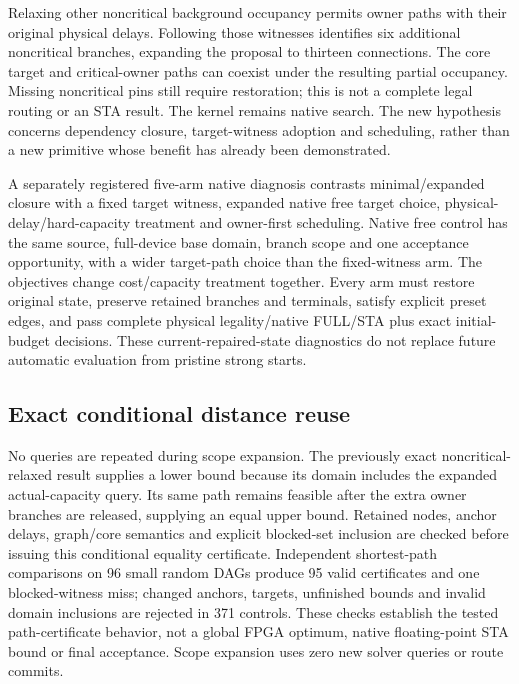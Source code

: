 Relaxing other noncritical background occupancy permits owner paths with their original physical delays. Following those witnesses identifies six additional noncritical branches, expanding the proposal to thirteen connections. The core target and critical-owner paths can coexist under the resulting partial occupancy. Missing noncritical pins still require restoration; this is not a complete legal routing or an STA result. The kernel remains native search. The new hypothesis concerns dependency closure, target-witness adoption and scheduling, rather than a new primitive whose benefit has already been demonstrated.

A separately registered five-arm native diagnosis contrasts minimal/expanded closure with a fixed target witness, expanded native free target choice, physical-delay/hard-capacity treatment and owner-first scheduling. Native free control has the same source, full-device base domain, branch scope and one acceptance opportunity, with a wider target-path choice than the fixed-witness arm. The objectives change cost/capacity treatment together. Every arm must restore original state, preserve retained branches and terminals, satisfy explicit preset edges, and pass complete physical legality/native FULL/STA plus exact initial-budget decisions. These current-repaired-state diagnostics do not replace future automatic evaluation from pristine strong starts.

\subsection{Exact conditional distance reuse}
No queries are repeated during scope expansion. The previously exact noncritical-relaxed result supplies a lower bound because its domain includes the expanded actual-capacity query. Its same path remains feasible after the extra owner branches are released, supplying an equal upper bound. Retained nodes, anchor delays, graph/core semantics and explicit blocked-set inclusion are checked before issuing this conditional equality certificate. Independent shortest-path comparisons on 96 small random DAGs produce 95 valid certificates and one blocked-witness miss; changed anchors, targets, unfinished bounds and invalid domain inclusions are rejected in 371 controls. These checks establish the tested path-certificate behavior, not a global FPGA optimum, native floating-point STA bound or final acceptance. Scope expansion uses zero new solver queries or route commits.
